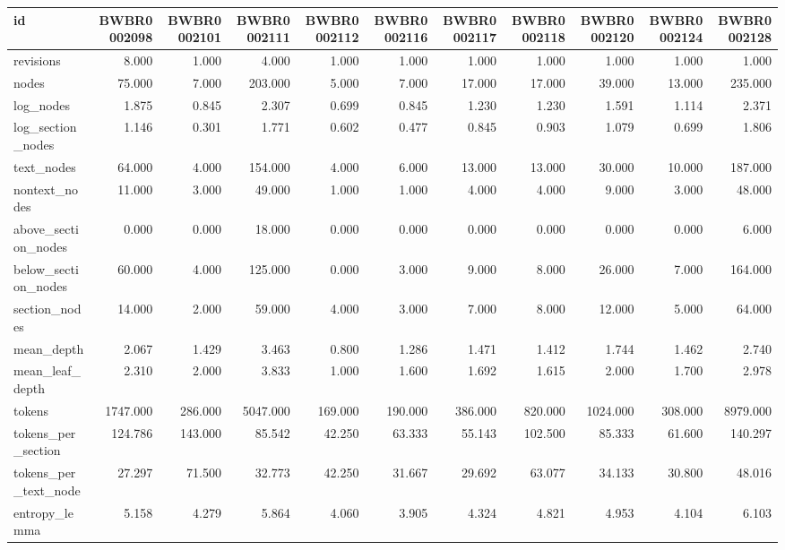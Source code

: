 \begin{tabular}{lrrrrrrrrrr}
\toprule
id & BWBR0002098 & BWBR0002101 & BWBR0002111 & BWBR0002112 & BWBR0002116 & BWBR0002117 & BWBR0002118 & BWBR0002120 & BWBR0002124 & BWBR0002128 \\
\midrule
revisions & 8.000 & 1.000 & 4.000 & 1.000 & 1.000 & 1.000 & 1.000 & 1.000 & 1.000 & 1.000 \\
\cline{1-11}
nodes & 75.000 & 7.000 & 203.000 & 5.000 & 7.000 & 17.000 & 17.000 & 39.000 & 13.000 & 235.000 \\
\cline{1-11}
log\_nodes & 1.875 & 0.845 & 2.307 & 0.699 & 0.845 & 1.230 & 1.230 & 1.591 & 1.114 & 2.371 \\
\cline{1-11}
log\_section\_nodes & 1.146 & 0.301 & 1.771 & 0.602 & 0.477 & 0.845 & 0.903 & 1.079 & 0.699 & 1.806 \\
\cline{1-11}
text\_nodes & 64.000 & 4.000 & 154.000 & 4.000 & 6.000 & 13.000 & 13.000 & 30.000 & 10.000 & 187.000 \\
\cline{1-11}
nontext\_nodes & 11.000 & 3.000 & 49.000 & 1.000 & 1.000 & 4.000 & 4.000 & 9.000 & 3.000 & 48.000 \\
\cline{1-11}
above\_section\_nodes & 0.000 & 0.000 & 18.000 & 0.000 & 0.000 & 0.000 & 0.000 & 0.000 & 0.000 & 6.000 \\
\cline{1-11}
below\_section\_nodes & 60.000 & 4.000 & 125.000 & 0.000 & 3.000 & 9.000 & 8.000 & 26.000 & 7.000 & 164.000 \\
\cline{1-11}
section\_nodes & 14.000 & 2.000 & 59.000 & 4.000 & 3.000 & 7.000 & 8.000 & 12.000 & 5.000 & 64.000 \\
\cline{1-11}
mean\_depth & 2.067 & 1.429 & 3.463 & 0.800 & 1.286 & 1.471 & 1.412 & 1.744 & 1.462 & 2.740 \\
\cline{1-11}
mean\_leaf\_depth & 2.310 & 2.000 & 3.833 & 1.000 & 1.600 & 1.692 & 1.615 & 2.000 & 1.700 & 2.978 \\
\cline{1-11}
tokens & 1747.000 & 286.000 & 5047.000 & 169.000 & 190.000 & 386.000 & 820.000 & 1024.000 & 308.000 & 8979.000 \\
\cline{1-11}
tokens\_per\_section & 124.786 & 143.000 & 85.542 & 42.250 & 63.333 & 55.143 & 102.500 & 85.333 & 61.600 & 140.297 \\
\cline{1-11}
tokens\_per\_text\_node & 27.297 & 71.500 & 32.773 & 42.250 & 31.667 & 29.692 & 63.077 & 34.133 & 30.800 & 48.016 \\
\cline{1-11}
entropy\_lemma & 5.158 & 4.279 & 5.864 & 4.060 & 3.905 & 4.324 & 4.821 & 4.953 & 4.104 & 6.103 \\

\end{tabular}
